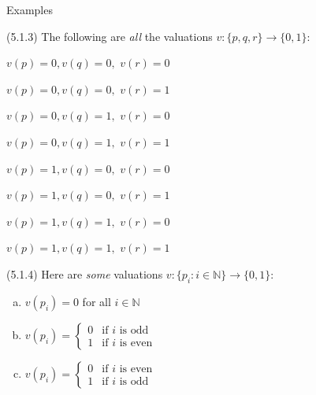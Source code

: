 \documentclass[../slides.tex]{subfiles}
\begin{document}
\begin{frame}{Examples}

(5.1.3) The following are \emph{all} the valuations $v:\{p,q,r\}\to \{0,1\}$:
	
\vspace{2ex}
		\begin{minipage}{.45\linewidth}
		\begin{enumerate}[(a)]
		{\scriptsize
			\item $v(p)=0, v(q)=0,$  $v(r)=0$
			\item $v(p)=0, v(q)=0,$  $v(r)=1$
			\item $v(p)=0, v(q)=1,$  $v(r)=0$
			\item $v(p)=0, v(q)=1,$ $v(r)=1$
		}	 	
		\end{enumerate}
		\end{minipage}
		\begin{minipage}{.45\linewidth}
		\begin{enumerate}[(a)]
		{\scriptsize
			\item $v(p)=1, v(q)=0,$  $v(r)=0$
			\item $v(p)=1, v(q)=0,$  $v(r)=1$
			\item $v(p)=1, v(q)=1,$  $v(r)=0$
			\item $v(p)=1, v(q)=1,$ $v(r)=1$
		}	 	
		\end{enumerate}
		\end{minipage}
		
	\vspace{2ex}

 (5.1.4) Here are \emph{some} valuations $v:\{p_i:i\in\mathbb{N}\}\to\{0,1\}$:
		
		{\scriptsize\begin{enumerate}[(a)]
		
			\item $v(p_i)=0$ for all $i\in \mathbb{N}$
		
			\item $v(p_i)=\begin{cases} 0 & \text{if }i\text{ is odd}\\1 & \text{if }i\text{ is even}\end{cases}$
			
			\item $v(p_i)=\begin{cases} 0 & \text{if }i\text{ is even}\\1 & \text{if }i\text{ is odd}\end{cases}$
			

\end{enumerate}}
\end{frame}
\end{document}
